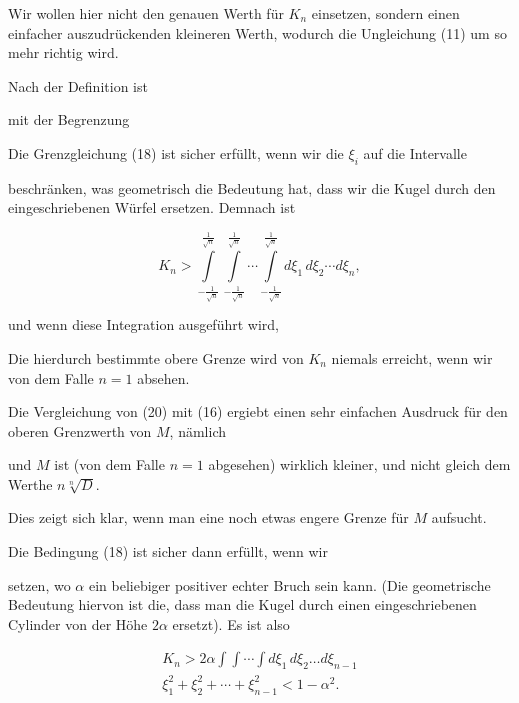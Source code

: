 Wir wollen hier nicht den genauen Werth für $K_n$ einsetzen, sondern
einen einfacher auszudrückenden kleineren Werth, wodurch die
Ungleichung (11) um so mehr richtig wird.

Nach der Definition ist


mit der Begrenzung


Die Grenzgleichung (18) ist sicher erfüllt, wenn wir die $\xi_i$
auf die Intervalle


beschränken, was geometrisch die Bedeutung hat, dass wir die Kugel
durch den eingeschriebenen Würfel ersetzen. Demnach ist

\[
K_n > \int\limits_{-\frac{1}{\sqrt n}}^{\frac{1}{\sqrt n}}
\int\limits_{-\frac{1}{\sqrt n}}^{\frac{1}{\sqrt n}}
\cdots
\int\limits_{-\frac{1}{\sqrt n}}^{\frac{1}{\sqrt n}}
d\xi_1\, d\xi_2 \cdots d\xi_n,
\]

und wenn diese Integration ausgeführt wird,


Die hierdurch bestimmte obere Grenze wird von $K_n$ niemals
erreicht, wenn wir von dem Falle $n = 1$ absehen.

Die Vergleichung von (20) mit (16) ergiebt einen sehr einfachen
Ausdruck für den oberen Grenzwerth von $M$, nämlich


und $M$ ist (von dem Falle $n = 1$ abgesehen) wirklich kleiner, und
nicht gleich dem Werthe $n \sqrt[n]{D}$.

Dies zeigt sich klar, wenn man eine noch etwas engere Grenze für
$M$ aufsucht.

Die Bedingung (18) ist sicher dann erfüllt, wenn wir


setzen, wo $\alpha$ ein beliebiger positiver echter Bruch sein kann.
(Die geometrische Bedeutung hiervon ist die, dass man die Kugel
durch einen eingeschriebenen Cylinder von der Höhe $2\alpha$
ersetzt). Es ist also

\[
\begin{gathered}
K_n > 2\alpha \int\!\int\!\cdots\!\int d\xi_1\, d\xi_2 \ldots d\xi_{n-1}\\
\xi_1^2 + \xi_2^2 + \cdots + \xi_{n-1}^2 < 1 - \alpha^2.
\end{gathered}
\]
